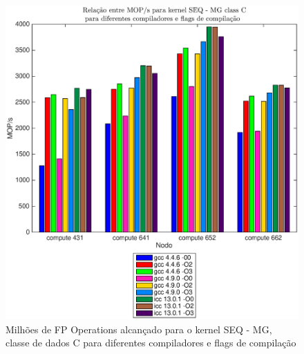 \documentclass[conference,compsoc]{IEEEtran}
\begin{document}
\begin{figure}[H]
\centering
\includegraphics[width=1.1\columnwidth]{EPS/SEQ/MOPS_seq_mg_C.eps}
\caption{Milhões de FP Operations alcançado para o kernel SEQ - MG, classe de dados C para diferentes compiladores e flags de compilação}
\label{mops_seq_mg_c}
\end{figure}
\end{document}

